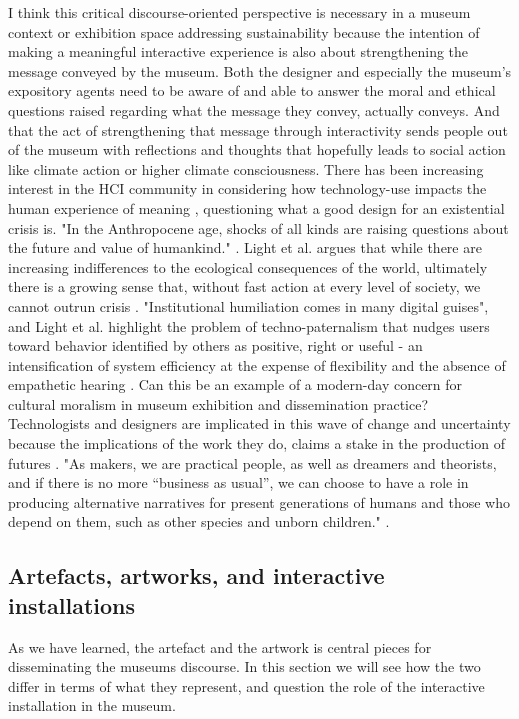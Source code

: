 I think this critical discourse-oriented perspective is necessary in a museum context or exhibition space addressing sustainability because the intention of making a meaningful interactive experience is also about strengthening the message conveyed by the museum. Both the designer and especially the museum's expository agents need to be aware of and able to answer the moral and ethical questions raised regarding what the message they convey, actually conveys. And that the act of strengthening that message through interactivity sends people out of the museum with reflections and thoughts that hopefully leads to social action like climate action or higher climate consciousness. There has been increasing interest in the HCI community in considering how technology-use impacts the human experience of meaning \autocite{light_design_2017}, questioning what a good design for an existential crisis is. "In the Anthropocene age, shocks of all kinds are raising questions about the future and value of humankind." \autocite[p. 723]{light_design_2017}. Light et al. argues that while there are increasing indifferences to the ecological consequences of the world, ultimately there is a growing sense that, without fast action at every level of society, we cannot outrun crisis \autocite[p. 723]{light_design_2017}. "Institutional humiliation comes in many digital guises", and Light et al. highlight the problem of techno-paternalism that nudges users toward behavior identified by others as positive, right or useful - an intensification of system efficiency at the expense of flexibility and the absence of empathetic hearing \autocite[p. 727]{light_design_2017}. Can this be an example of a modern-day concern for cultural moralism in museum exhibition and dissemination practice? 
Technologists and designers are implicated in this wave of change and uncertainty because the implications of the work they do, claims a stake in the production of futures \autocite[p. 723]{light_design_2017}. "As makers, we are practical people, as well as dreamers and theorists, and if there is no more “business as usual”, we can choose to have a role in producing alternative narratives for present generations of humans and those who depend on them, such as other species and unborn children." \autocite[p. 723]{light_design_2017}.


\subsection{Artefacts, artworks, and interactive installations}
As we have learned, the artefact and the artwork is central pieces for disseminating the museums discourse. In this section we will see how the two differ in terms of what they represent, and question the role of the interactive installation in the museum. 


